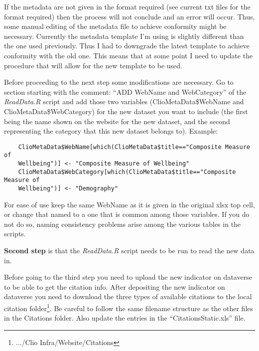 \documentclass[a4paper]{article}
\begin{document}
If the metadata are not given in the format required (see current txt files for 
the format required) then the process will not conclude and an error will 
occur. Thus, some manual editing of the metadata file to achieve conformity 
might be necessary. Currently the metadata template I'm using is slightly 
different than the one used previously. Thus I had to downgrade the latest 
template to achieve conformity with the old one. This means that at some point 
I need to update the procedure that will allow for the new template to be used.

 Before proceeding to the next step some modifications are necessary. Go to section starting with the 
comment: ``ADD WebName and WebCategory'' of the \textit{ReadData.R} script and add those two variables 
(ClioMetaData\$WebName and ClioMetaData\$WebCategory) for the new dataset you 
want to include (the first being the name shown on the website for the new 
dataset, and the second representing the category that this new dataset belongs 
to). Example:

\begin{verbatim}
	ClioMetaData$WebName[which(ClioMetaData$title=="Composite Measure of 
	Wellbeing")] <- "Composite Measure of Wellbeing"
	ClioMetaData$WebCategory[which(ClioMetaData$title=="Composite Measure of 
	Wellbeing")] <- "Demography"
\end{verbatim}

For ease of use keep the same WebName as it is given in the original xlsx top cell, or change that named to a one that is common among those variables. If you do not do so, naming consistency problems arise among the various tables in the scripts.

\textbf{Second step} is that the \textit{ReadData.R} script needs to be run to read the new data in.

Before going to the third step you need to upload the new indicator on dataverse to be able to get the citation info. After depositing the new indicator on dataverse you need to download the three types of available citations to the local citation folder\footnote{.../Clio Infra/Website/Citations}. Be careful to follow the same filename structure as the other files in the Citations folder. Also update the entries in the ``CitationsStatic.xls'' file. %
\end{document}
